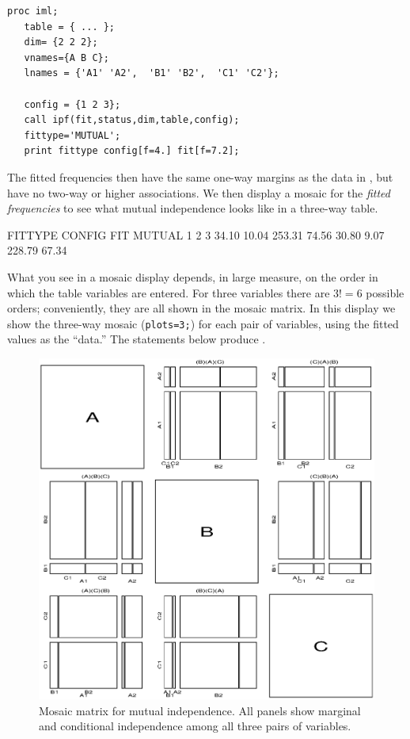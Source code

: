 \begin{verbatim}
proc iml;
   table = { ... };
   dim= {2 2 2};
   vnames={A B C};
   lnames = {'A1' 'A2',  'B1' 'B2',  'C1' 'C2'};

   config = {1 2 3};
   call ipf(fit,status,dim,table,config);
   fittype='MUTUAL';
   print fittype config[f=4.] fit[f=7.2];
\end{verbatim}
The fitted frequencies then have the same one-way margins as the
data in , but have no two-way or higher associations.
We then display a mosaic for the \emph{fitted frequencies}
to see what mutual independence looks like in a three-way table.
\begin{output}
   FITTYPE  CONFIG             FIT
   MUTUAL      1   2   3     34.10   10.04  253.31   74.56
                             30.80    9.07  228.79   67.34
\end{output}
What you see in a mosaic display depends, in large measure, on the order in
which the table variables are entered.
For three variables there are $3!=6$ possible orders;  conveniently,
they are all shown in the mosaic matrix.
In this display we show the three-way mosaic (\texttt{plots=3;})
for each pair of variables, using the fitted values as the ``data.''
The statements below produce .
\begin{figure}[htb]
  \centering
  \includegraphics[scale=.6]{ch4/fig/mosfit-1}
  \caption[Mosaic matrix for mutual independence]{Mosaic matrix for mutual independence.  All panels show marginal and conditional independence among all three pairs of variables.}%
  \label{fig:mosfit-1}
\end{figure}

